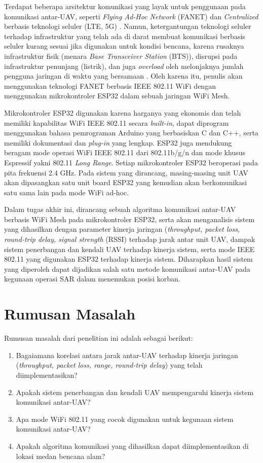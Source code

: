 Terdapat beberapa arsitektur komunikasi yang layak untuk penggunaan pada komunikasi antar-UAV, seperti \textit{Flying Ad-Hoc Network} (FANET) \cite{khanFlyingAdhocNetworks2017} dan \textit{Centralized} berbasis teknologi seluler (LTE, 5G) \cite{linSkyNotLimit2018}. Namun, ketergantungan teknologi seluler terhadap infrastruktur yang telah ada di darat membuat komunikasi berbasis seluler kurang sesuai jika digunakan untuk kondisi bencana, karena rusaknya infrastruktur fisik (menara \textit{Base Transceiver Station} (BTS)), disrupsi pada infrastruktur penunjang (listrik), dan juga \textit{overload} oleh melonjaknya jumlah pengguna jaringan di waktu yang bersamaan  \cite{townsendTelecommunicationsInfrastructureDisasters2005}. Oleh karena itu, penulis akan menggunakan teknologi FANET berbasis IEEE 802.11 WiFi dengan menggunakan mikrokontroler ESP32 dalam sebuah jaringan WiFi Mesh.

Mikrokontroler ESP32 digunakan karena harganya yang ekonomis dan telah memiliki kapabilitas WiFi IEEE 802.11 secara \textit{built-in}, dapat diprogram menggunakan bahasa pemrograman Arduino yang berbasiskan C dan C++, serta memiliki dokumentasi dan \textit{plug-in} yang lengkap. ESP32 juga mendukung beragam mode operasi WiFi IEEE 802.11 dari 802.11b/g/n dan mode khusus Espressif yakni 802.11 \textit{Long Range}. Setiap mikrokontroler ESP32 beroperasi pada pita frekuensi 2.4 GHz. Pada sistem yang dirancang, masing-masing unit UAV akan dipasangkan satu unit board ESP32 yang kemudian akan berkomunikasi satu sama lain pada mode WiFi ad-hoc.

Dalam tugas akhir ini, dirancang sebuah algoritma komunikasi antar-UAV berbasis WiFi Mesh pada mikrokontroler ESP32, serta akan menganalisis sistem yang dihasilkan dengan parameter kinerja jaringan (\textit{throughput, packet loss, round-trip delay, signal strength }(RSSI) terhadap jarak antar unit UAV, dampak sistem penerbangan dan kendali UAV terhadap kinerja sistem, serta mode IEEE 802.11 yang digunakan ESP32 terhadap kinerja sistem. Diharapkan hasil sistem yang diperoleh dapat dijadikan salah satu metode komunikasi antar-UAV pada kegunaan operasi SAR dalam menemukan posisi korban.

\section{Rumusan Masalah}
Rumusan masalah dari penelitian ini adalah sebagai berikut:
\begin{enumerate}
	\item Bagaiamana korelasi antara jarak antar-UAV terhadap kinerja jaringan (\textit{throughput, packet loss, range, round-trip delay}) yang telah diimplementasikan?
	\item Apakah sistem penerbangan dan kendali UAV mempengaruhi kinerja sistem komunikasi antar-UAV?
	\item Apa mode WiFi 802.11 yang cocok digunakan untuk kegunaan sistem komunikasi antar-UAV?
	\item Apakah algoritma komunikasi yang dihasilkan dapat diimplementasikan di lokasi medan bencana alam?
\end{enumerate}

